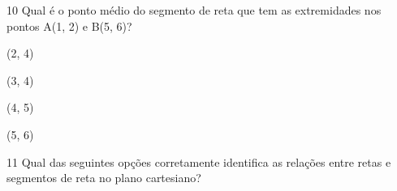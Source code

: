 

\pagebreak

\num{10} Qual é o ponto médio do segmento de reta que tem as extremidades nos
pontos A(1, 2) e B(5, 6)?

\begin{escolha}
\item (2, 4)
\item (3, 4)
\item (4, 5)
\item (5, 6)
\end{escolha}







\num{11} Qual das seguintes opções corretamente identifica as relações entre
retas e segmentos de reta no plano cartesiano?

